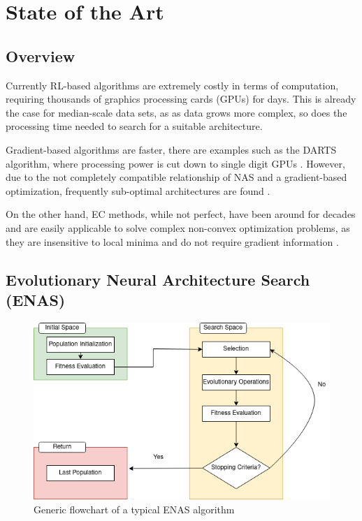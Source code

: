 \documentclass[10pt,        %
               a4paper,     %
               journal,     %
               ]{IEEEtran}
\begin{document}
\section{State of the Art}
\label{SOA}

\subsection{Overview}
Currently RL-based algorithms are extremely costly in terms of computation, requiring thousands of
graphics processing cards (GPUs) for days. This is already the case for median-scale data sets, as
as data grows more complex, so does the processing time needed to search for a suitable architecture.

Gradient-based algorithms are faster, there are examples such as the DARTS algorithm, where processing power
is cut down to single digit GPUs \cite{liu2018darts}. However, due to the not completely compatible relationship
of NAS and a gradient-based optimization, frequently sub-optimal architectures are found \cite{liu2021survey}.

On the other hand, EC methods, while not perfect, have been around for decades and are easily applicable
to solve complex non-convex optimization problems, as they are insensitive to local minima and do not require
gradient information \cite{liu2021survey}.

\subsection{Evolutionary Neural Architecture Search (ENAS)}
\label{EV}

\begin{figure}[!h]
    \centering
    \includegraphics[scale=0.4]{evol}
    \caption{Generic flowchart of a typical ENAS algorithm}
    \label{evol}
\end{figure}
\end{document}
